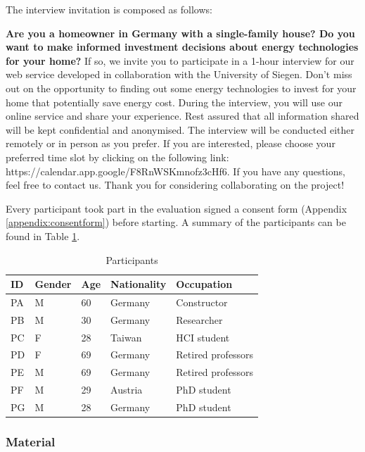 The interview invitation is composed as follows:

\textbf{Are you a homeowner in Germany with a single-family house? 
Do you want to make informed investment decisions about energy technologies for your home? }
If so, we invite you to participate in a 1-hour interview for our web service developed in collaboration with the University of Siegen.
Don't miss out on the opportunity to finding out some energy technologies to invest for your home that potentially save energy cost. 
During the interview, you will use our online service and share your experience.
Rest assured that all information shared will be kept confidential and anonymised. 
The interview will be conducted either remotely or in person as you prefer. 
If you are interested, please choose your preferred time slot by clicking on the following link: https://calendar.app.google/F8RnWSKmnofz3cHf6. 
If you have any questions, feel free to contact us.
Thank you for considering collaborating on the project! 

Every participant took part in the evaluation signed a consent form (Appendix \ref{appendix:consentform}) before starting. 
A summary of the participants can be found in Table \ref{tab:participants}.
\begin{table}[h!]
  \centering
  \begin{tabular}{ | p{} | p{} | p{} | p{} | p{} | } 
    \hline
    ID & Gender & Age & Nationality & Occupation \\
    \hline
    PA & M & 60 & Germany & Constructor \\
    \hline
    PB & M & 30 & Germany & Researcher \\
    \hline
    PC & F & 28 & Taiwan & HCI student \\
    \hline
    PD & F & 69 & Germany & Retired professors \\
    \hline
    PE & M & 69 & Germany & Retired professors \\
    \hline
    PF & M & 29 & Austria & PhD student \\
    \hline
    PG & M & 28 & Germany & PhD student \\
    \hline
  \end{tabular}
  \caption{Participants}
  \label{tab:participants}
\end{table}


\subsubsection{Material}

